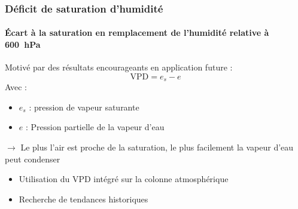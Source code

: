 \documentclass[aspectratio=169, usepdftitle=false, xcolor={dvipsnames}, 9pt,table]{beamer}
\begin{document}
\begin{frame}
    \frametitle{Déficit de saturation d'humidité}
    \framesubtitle{Écart à la saturation en remplacement de l'humidité relative à 600~hPa}
    \small
    \begin{definition}
        \footnotesize
        Motivé par des résultats encourageants en application future \parencite{camargo_testing_2014}:\\
        \[ \text{VPD} = e_s - e \]
        Avec :
        \setlength{\leftmargini}{2.5ex}
        \begin{itemize}
            \item $e_s$ : pression de vapeur saturante
            \item $e$ : Pression partielle de la vapeur d'eau
        \end{itemize}
        \vspace{\baselineskip}
        $\longrightarrow$ Le plus l'air est proche de la saturation, le plus facilement la vapeur d'eau peut condenser
    \end{definition}
    \vspace{1em}
    \small
    \begin{examples}[Méthodologie]
        \small
        \begin{itemize}
            \item Utilisation du VPD intégré sur la colonne atmosphérique \parencite{camargo_testing_2014}
            \item Recherche de tendances historiques
        \end{itemize}
    \end{examples}
\end{frame}
\end{document}
